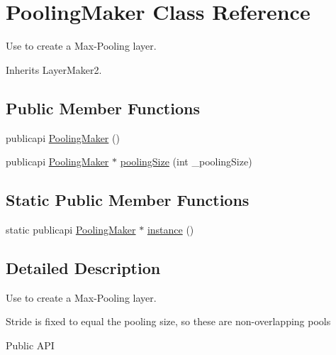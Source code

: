 \hypertarget{classPoolingMaker}{\section{Pooling\-Maker Class Reference}
\label{classPoolingMaker}
}


Use to create a Max-\/\-Pooling layer.  




Inherits Layer\-Maker2.

\subsection*{Public Member Functions}
\begin{DoxyCompactItemize}
\item 
publicapi \hyperlink{classPoolingMaker_a7451479c694f4cecd9dbb65db337790d}{Pooling\-Maker} ()
\item 
publicapi \hyperlink{classPoolingMaker}{Pooling\-Maker} $\ast$ \hyperlink{classPoolingMaker_a92fe382317eddb2a904cf0aea20f10d8}{pooling\-Size} (int \-\_\-pooling\-Size)
\end{DoxyCompactItemize}
\subsection*{Static Public Member Functions}
\begin{DoxyCompactItemize}
\item 
static publicapi \hyperlink{classPoolingMaker}{Pooling\-Maker} $\ast$ \hyperlink{classPoolingMaker_ad2ac0ab098babb5f331d2deec11ad762}{instance} ()
\end{DoxyCompactItemize}


\subsection{Detailed Description}
Use to create a Max-\/\-Pooling layer. 

Stride is fixed to equal the pooling size, so these are non-\/overlapping pools \begin{DoxyParagraph}{Public A\-P\-I}

\end{DoxyParagraph}


